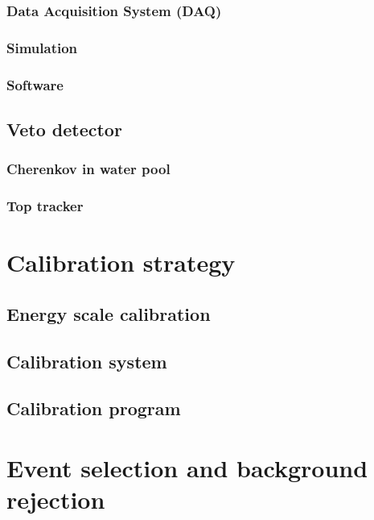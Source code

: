 \subsubsection{Data Acquisition System (DAQ)}

\subsubsection{Simulation}

\subsubsection{Software}



\subsection{Veto detector}

\subsubsection{Cherenkov in water pool}

\subsubsection{Top tracker}

\section{Calibration strategy}

\subsection{Energy scale calibration}

\subsection{Calibration system}

\subsection{Calibration program}

\section{Event selection and background rejection}

